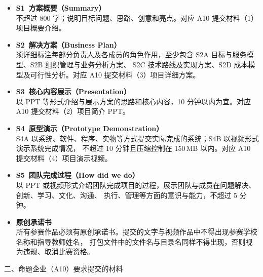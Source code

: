 \documentclass[
    12pt,
    a4paper,
    UTF8
]{ctexart}
\newcommand{\itemgap}{0.24cm}
\newcommand{\mat}[1]{{\bfseries\color{deepblue}#1}}
\newcommand{\note}[1]{{\small\color{black!62}#1}}
\begin{document}
\begin{itemize}[leftmargin=0pt,label={},itemsep=\itemgap,parsep=0pt,topsep=0pt]
    \item \mat{S1\ 方案概要（Summary）}\\
          \note{不超过 800 字；说明目标问题、思路、创意和亮点。对应 A10 提交材料（1）项目概要介绍。}

    \item \mat{S2\ 解决方案（Business Plan）}\\
          \note{须详细标注每部分负责人及各成员的角色作用，至少包含 S2A 目标与服务模型、S2B 组织管理与业务分析方案、
           S2C 技术路线及实现方案、S2D 成本模型及可行性分析。对应 A10 提交材料（3）项目详细方案。}

    \item \mat{S3\ 核心内容展示（Presentation）}\\
          \note{以 PPT 等形式介绍与展示方案的思路和核心内容，10 分钟以内为宜。对应 A10 提交材料（2）项目简介 PPT。}

    \item \mat{S4\ 原型演示（Prototype Demonstration）}\\
          \note{S4A 以系统、软件、程序、实物等方式提交实际完成的系统；S4B 以视频形式演示系统完成情况，
           不超过 10 分钟且压缩控制在 150\,MB 以内。对应 A10 提交材料（4）项目演示视频。}

    \item \mat{S5\ 团队完成过程（How did we do）}\\
          \note{以 PPT 或视频形式介绍团队完成项目的过程，展示团队与成员在问题解决、创新、学习、文化、沟通、
           执行、管理等方面的意识与能力，不超过 5 分钟。}

    \item \mat{原创承诺书}\\
          \note{所有参赛作品必须有原创承诺书。提交的文字与视频作品中不得出现参赛学校名称和指导教师姓名，
           打包文件中的文件名与目录名同样不得出现，否则视为违规、取消比赛资格。}
\end{itemize}

\vspace{0.45cm}


{\heiti\color{deepblue} 二、命题企业（A10）要求提交的材料}

\vspace{0.3cm}
\end{document}
